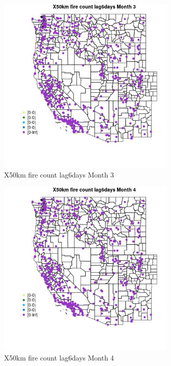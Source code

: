 \begin{figure} 
\centering  
\includegraphics[width=0.77\textwidth]{Code_Outputs/Report_ML_input_PM25_Step4_part_e_de_duplicated_aves_compiled_2019-05-14wNAs_MapObsMo3X50km_fire_count_lag6days.jpg} 
\caption{\label{fig:Report_ML_input_PM25_Step4_part_e_de_duplicated_aves_compiled_2019-05-14wNAsMapObsMo3X50km_fire_count_lag6days}X50km fire count lag6days Month 3} 
\end{figure} 
 

\begin{figure} 
\centering  
\includegraphics[width=0.77\textwidth]{Code_Outputs/Report_ML_input_PM25_Step4_part_e_de_duplicated_aves_compiled_2019-05-14wNAs_MapObsMo4X50km_fire_count_lag6days.jpg} 
\caption{\label{fig:Report_ML_input_PM25_Step4_part_e_de_duplicated_aves_compiled_2019-05-14wNAsMapObsMo4X50km_fire_count_lag6days}X50km fire count lag6days Month 4} 
\end{figure} 
 

